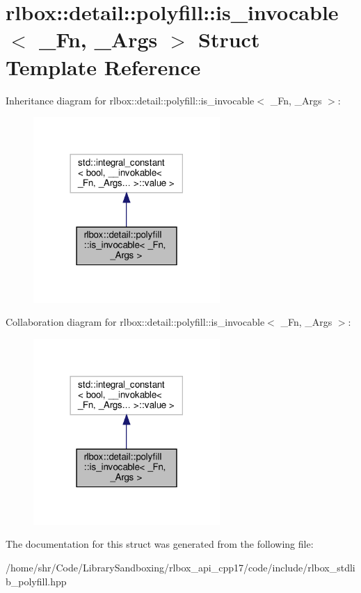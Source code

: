 \hypertarget{structrlbox_1_1detail_1_1polyfill_1_1is__invocable}{}\section{rlbox\+:\+:detail\+:\+:polyfill\+:\+:is\+\_\+invocable$<$ \+\_\+\+Fn, \+\_\+\+Args $>$ Struct Template Reference}
\label{structrlbox_1_1detail_1_1polyfill_1_1is__invocable}


Inheritance diagram for rlbox\+:\+:detail\+:\+:polyfill\+:\+:is\+\_\+invocable$<$ \+\_\+\+Fn, \+\_\+\+Args $>$\+:
\nopagebreak
\begin{figure}[H]
\begin{center}
\leavevmode
\includegraphics[width=201pt]{structrlbox_1_1detail_1_1polyfill_1_1is__invocable__inherit__graph}
\end{center}
\end{figure}


Collaboration diagram for rlbox\+:\+:detail\+:\+:polyfill\+:\+:is\+\_\+invocable$<$ \+\_\+\+Fn, \+\_\+\+Args $>$\+:
\nopagebreak
\begin{figure}[H]
\begin{center}
\leavevmode
\includegraphics[width=201pt]{structrlbox_1_1detail_1_1polyfill_1_1is__invocable__coll__graph}
\end{center}
\end{figure}


The documentation for this struct was generated from the following file\+:\begin{DoxyCompactItemize}
\item 
/home/shr/\+Code/\+Library\+Sandboxing/rlbox\+\_\+api\+\_\+cpp17/code/include/rlbox\+\_\+stdlib\+\_\+polyfill.\+hpp\end{DoxyCompactItemize}
